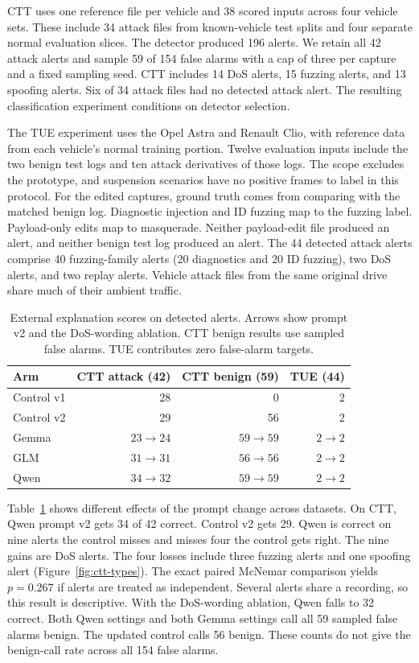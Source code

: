 \documentclass[sigconf,pbalance=true]{acmart}
\begin{document}
CTT uses one reference file per vehicle and 38 scored inputs across four vehicle sets. These include 34 attack files from known-vehicle test splits and four separate normal evaluation slices. The detector produced 196 alerts. We retain all 42 attack alerts and sample 59 of 154 false alarms with a cap of three per capture and a fixed sampling seed. CTT includes 14 DoS alerts, 15 fuzzing alerts, and 13 spoofing alerts. Six of 34 attack files had no detected attack alert. The resulting classification experiment conditions on detector selection.

The TUE experiment uses the Opel Astra and Renault Clio, with reference data from each vehicle's normal training portion. Twelve evaluation inputs include the two benign test logs and ten attack derivatives of those logs. The scope excludes the prototype, and suspension scenarios have no positive frames to label in this protocol. For the edited captures, ground truth comes from comparing with the matched benign log. Diagnostic injection and ID fuzzing map to the fuzzing label. Payload-only edits map to masquerade. Neither payload-edit file produced an alert, and neither benign test log produced an alert. The 44 detected attack alerts comprise 40 fuzzing-family alerts (20 diagnostics and 20 ID fuzzing), two DoS alerts, and two replay alerts. Vehicle attack files from the same original drive share much of their ambient traffic.

\begin{table}[t]
  \caption{External explanation scores on detected alerts. Arrows show prompt v2 and the DoS-wording ablation. CTT benign results use sampled false alarms. TUE contributes zero false-alarm targets.}
  \label{tab:external}
  \small
  \centering
  \begin{tabular}{@{}lrrr@{}}
  \toprule
  Arm & CTT attack (42) & CTT benign (59) & TUE (44) \\
  \midrule
  Control v1 & 28 & 0 & 2 \\
  Control v2 & 29 & 56 & 2 \\
  Gemma & $23\to24$ & $59\to59$ & $2\to2$ \\
  GLM & $31\to31$ & $56\to56$ & $2\to2$ \\
  Qwen & $34\to32$ & $59\to59$ & $2\to2$ \\
  \bottomrule
  \end{tabular}
\end{table}

Table~\ref{tab:external} shows different effects of the prompt change across datasets. On CTT, Qwen prompt v2 gets 34 of 42 correct. Control v2 gets 29. Qwen is correct on nine alerts the control misses and misses four the control gets right. The nine gains are DoS alerts. The four losses include three fuzzing alerts and one spoofing alert (Figure~\ref{fig:ctt-types}). The exact paired McNemar comparison yields $p=0.267$ if alerts are treated as independent. Several alerts share a recording, so this result is descriptive. With the DoS-wording ablation, Qwen falls to 32 correct. Both Qwen settings and both Gemma settings call all 59 sampled false alarms benign. The updated control calls 56 benign. These counts do not give the benign-call rate across all 154 false alarms.
\end{document}
